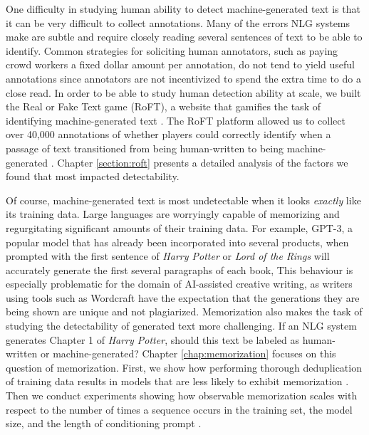 One difficulty in studying human ability to detect machine-generated text is that it can be very difficult to collect annotations.
Many of the errors NLG systems make are subtle and require closely reading several sentences of text to be able to identify.
Common strategies for soliciting human annotators, such as paying crowd workers a fixed dollar amount per annotation, do not tend to yield useful annotations since annotators are not incentivized to spend the extra time to do a close read.
In order to be able to study human detection ability at scale, we built the Real or Fake Text game (RoFT), a website that gamifies the task of identifying machine-generated text \citep{dugan2020roft}.
The RoFT platform allowed us to collect over 40,000 annotations of whether players could correctly identify when a passage of text transitioned from being human-written to being machine-generated .
Chapter \ref{section:roft} presents a detailed analysis of the factors we found that most impacted detectability. 
 
Of course, machine-generated text is most undetectable when it looks \textit{exactly} like its training data.
Large languages are worryingly capable of memorizing and regurgitating significant amounts of their training data.
For example, GPT-3, a popular model that has already been incorporated into several products, when prompted with the first sentence of \textit{Harry Potter} or \textit{Lord of the Rings} will accurately generate the first several paragraphs of each book,
This behaviour is especially problematic for the domain of AI-assisted creative writing, as writers using tools such as Wordcraft have the expectation that the generations they are being shown are unique and not plagiarized.
Memorization also makes the task of studying the detectability of generated text more challenging.
If an NLG system generates Chapter 1 of \textit{Harry Potter}, should this text be labeled as human-written or machine-generated?
Chapter \ref{chap:memorization} focuses on this question of memorization.
First, we show how performing thorough deduplication of training data results in models that are less likely to exhibit memorization .
Then we conduct experiments showing how observable memorization scales with respect to the number of times a sequence occurs in the training set, the model size, and the length of conditioning prompt \citep{carlini2022quantifying}.


